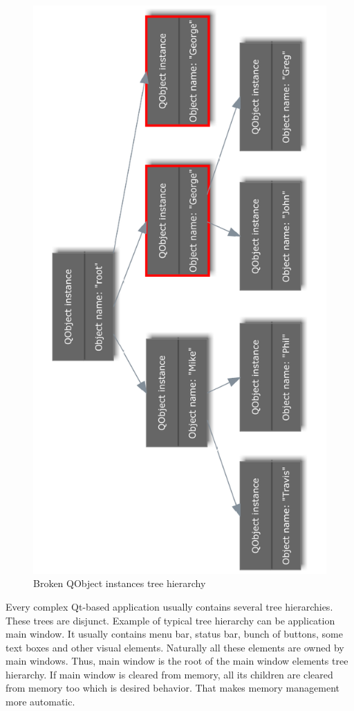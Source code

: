 \begin{figure}[ht]
\centering
\includegraphics[angle=-90,width=13cm]{graphics/laboratory/13-samenames.pdf}
\caption{Broken QObject instances tree hierarchy}\label{figure:samenames}
\end{figure}

Every complex Qt-based application usually contains several tree hierarchies. These trees are disjunct. Example of typical tree hierarchy can be application main window. It usually contains menu bar, status bar, bunch of buttons, some text boxes and other visual elements. Naturally all these elements are owned by main windows. Thus, main window is the root of the main window elements tree hierarchy. If main window is cleared from memory, all its children are cleared from memory too which is desired behavior. That makes memory management more automatic.

